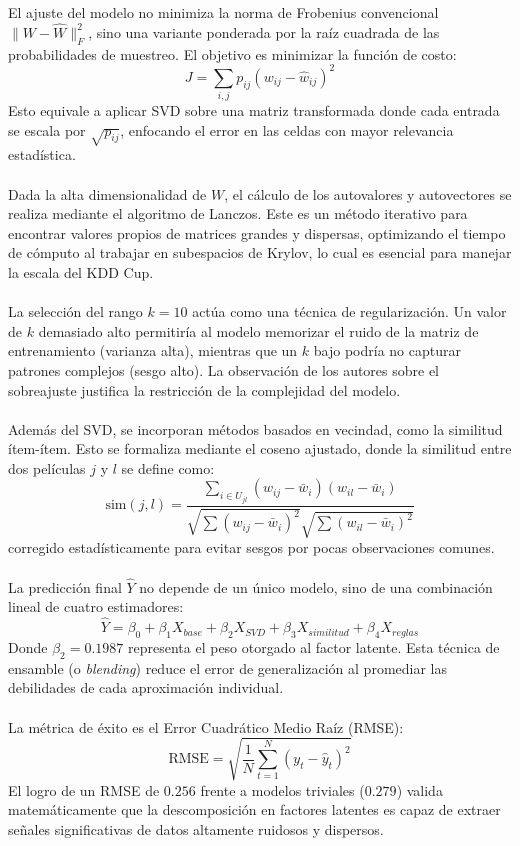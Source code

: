 \documentclass{article}
\begin{document}
El ajuste del modelo no minimiza la norma de Frobenius convencional $\|W - \hat{W}\|_F^2$, sino una variante ponderada por la raíz cuadrada de las probabilidades de muestreo. El objetivo es minimizar la función de costo:
\[ J = \sum_{i,j} p_{ij} (w_{ij} - \hat{w}_{ij})^2 \]
Esto equivale a aplicar SVD sobre una matriz transformada donde cada entrada se escala por $\sqrt{p_{ij}}$, enfocando el error en las celdas con mayor relevancia estadística. \\ \\
Dada la alta dimensionalidad de $W$, el cálculo de los autovalores y autovectores se realiza mediante el algoritmo de Lanczos. Este es un método iterativo para encontrar valores propios de matrices grandes y dispersas, optimizando el tiempo de cómputo al trabajar en subespacios de Krylov, lo cual es esencial para manejar la escala del KDD Cup. \\ \\
La selección del rango $k=10$ actúa como una técnica de regularización. Un valor de $k$ demasiado alto permitiría al modelo memorizar el ruido de la matriz de entrenamiento (varianza alta), mientras que un $k$ bajo podría no capturar patrones complejos (sesgo alto). La observación de los autores sobre el sobreajuste justifica la restricción de la complejidad del modelo. \\ \\
Además del SVD, se incorporan métodos basados en vecindad, como la similitud ítem-ítem. Esto se formaliza mediante el coseno ajustado, donde la similitud entre dos películas $j$ y $l$ se define como:
\[ \text{sim}(j, l) = \frac{\sum_{i \in U_{jl}} (w_{ij} - \bar{w}_i)(w_{il} - \bar{w}_i)}{\sqrt{\sum (w_{ij} - \bar{w}_i)^2} \sqrt{\sum (w_{il} - \bar{w}_i)^2}} \]
corregido estadísticamente para evitar sesgos por pocas observaciones comunes. \\ \\
La predicción final $\hat{Y}$ no depende de un único modelo, sino de una combinación lineal de cuatro estimadores:
\[ \hat{Y} = \beta_0 + \beta_1 X_{base} + \beta_2 X_{SVD} + \beta_3 X_{similitud} + \beta_4 X_{reglas} \]
Donde $\beta_2 = 0.1987$ representa el peso otorgado al factor latente. Esta técnica de ensamble (o \textit{blending}) reduce el error de generalización al promediar las debilidades de cada aproximación individual. \\ \\
La métrica de éxito es el Error Cuadrático Medio Raíz (RMSE):
\[ \text{RMSE} = \sqrt{\frac{1}{N} \sum_{t=1}^{N} (y_t - \hat{y}_t)^2} \]
El logro de un RMSE de $0.256$ frente a modelos triviales ($0.279$) valida matemáticamente que la descomposición en factores latentes es capaz de extraer señales significativas de datos altamente ruidosos y dispersos.
\end{document}
